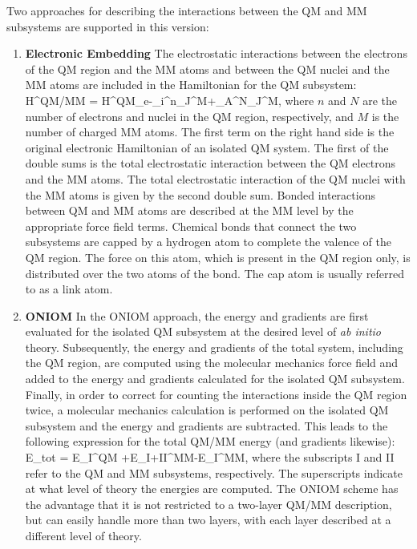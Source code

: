 Two approaches for describing the interactions between the QM and MM
subsystems are supported in this version:

\begin{enumerate}
\item{\textbf{Electronic Embedding}} The electrostatic interactions
between the electrons of the QM region and the MM atoms and between
the QM nuclei and the MM atoms are included in the Hamiltonian for
the QM subsystem: \beq H^{QM/MM} =
H^{QM}_e-\sum_i^n\sum_J^M+\sum_A^N\sum_J^M,
\eeq where $n$ and $N$ are the number of electrons and nuclei in the
QM region, respectively, and $M$ is the number of charged MM
atoms. The first term on the right hand side is the original
electronic Hamiltonian of an isolated QM system. The first of the
double sums is the total electrostatic interaction between the QM
electrons and the MM atoms. The total electrostatic interaction of the
QM nuclei with the MM atoms is given by the second double sum. Bonded
interactions between QM and MM atoms are described at the MM level by
the appropriate force field terms. Chemical bonds that connect the two
subsystems are capped by a hydrogen atom to complete the valence of
the QM region. The force on this atom, which is present in the QM
region only, is distributed over the two atoms of the bond. The cap
atom is usually referred to as a link atom.

\item{\textbf{ONIOM}} In the ONIOM approach, the energy and gradients
are first evaluated for the isolated QM subsystem at the desired level
of {\it{ab initio}} theory. Subsequently, the energy and gradients of
the total system, including the QM region, are computed using the
molecular mechanics force field and added to the energy and gradients
calculated for the isolated QM subsystem. Finally, in order to correct
for counting the interactions inside the QM region twice, a molecular
mechanics calculation is performed on the isolated QM subsystem and
the energy and gradients are subtracted. This leads to the following
expression for the total QM/MM energy (and gradients likewise): \beq
E_{tot} = E_{I}^{QM}
+E_{I+II}^{MM}-E_{I}^{MM}, \eeq where the
subscripts I and II refer to the QM and MM subsystems,
respectively. The superscripts indicate at what level of theory the
energies are computed. The ONIOM scheme has the
advantage that it is not restricted to a two-layer QM/MM description,
but can easily handle more than two layers, with each layer described
at a different level of theory.
\end{enumerate}

